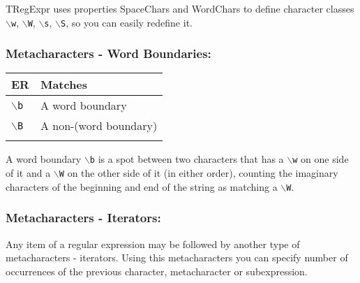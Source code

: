 TRegExpr uses properties SpaceChars and WordChars to define character
classes \texttt{$\backslash$w}, \texttt{$\backslash$W},
\texttt{$\backslash$s}, \texttt{$\backslash$S}, so you can easily
redefine it.


\subsubsection{Metacharacters - Word Boundaries:}

\begin{footnotesize}
  \begin{tabularx}{\textwidth}{>{\hsize=0.3\hsize}X>{\hsize=0.7\hsize}X}\\
    \hline
    \textbf{ER} & \textbf{Matches} \\
    \hline
    \texttt{$\backslash$b} & A word boundary \\
    \texttt{$\backslash$B} & A non-(word boundary) \\
    \hline
    \\
  \end{tabularx}
\end{footnotesize}

A word boundary \texttt{$\backslash$b} is a spot between two characters
that has a \texttt{$\backslash$w} on one side of it and a \texttt{$\backslash$W}
on the other side of it (in either order), counting the imaginary characters
of the beginning and end of the string as matching a \texttt{$\backslash$W}.


\subsubsection{Metacharacters - Iterators:}

Any item of a regular expression may be followed by another type of
metacharacters - iterators. Using this metacharacters you can specify
number of occurrences of the previous character, metacharacter or subexpression.

